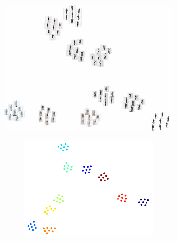 	\begin{figure}[htp]
		\centering
		\begin{subfigure}{0.49\linewidth}
		\includegraphics[trim={0cm 0cm 0cm 0cm},clip, width=1.0\linewidth]{fig/factor/tsne_img}
		\end{subfigure}
		\begin{subfigure}{0.49\linewidth}
			\begin{subfigure}{0.49\linewidth}
			\includegraphics[trim={0cm 0cm 0cm 0cm},clip, width=1.0\linewidth]{fig/factor/tsne10}
			\end{subfigure}\begin{subfigure}{0.49\linewidth}

\end{subfigure}
\end{subfigure}
\end{figure}

